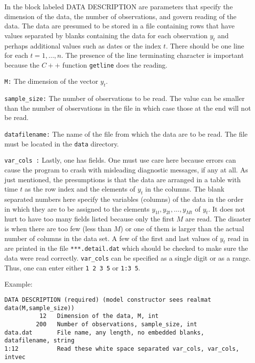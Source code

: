 \documentclass[11pt, letterpaper, notitlepage]{article}
\begin{document}
In the block labeled DATA DESCRIPTION are parameters that specify the dimension of the data, the number of observations, and govern reading of the data. The data are presumed to be stored in a file containing rows that have values separated by blanks containing the data for each observation $y_t$ and perhaps additional values such as dates or the index $t$. There should be one line for each $t = 1, \dots , n$. The presence of the line terminating character is important because the $C++$ function \texttt{getline} does the reading.

\texttt{M:} The dimension of the vector $y_t$.

\texttt{sample\_size:} The number of observations to be read. The value can be smaller than the number of observations in the file in which case those at the end will not be read.

\texttt{datafilename:} The name of the file from which the data are to be read. The file must be located in the \texttt{data} directory.

\texttt{var\_cols :} Lastly, one has fields. One must use care here because errors can cause the program to crash with misleading diagnostic messages, if any at all. As just mentioned, the presumptions is that the data are arranged in a table with time $t$ as the row index and the elements of $y_t$ in the columns. The blank separated numbers here specify the variables (columns) of the data in the order in which they are to be assigned to the elements $y_{1t}, y_{2t}, \dots, y_{Mt}$ of $y_t$. It does not hurt to have too many fields listed because only the first $M$ are read. The disaster is when there are too few (less than $M$) or one of them is larger than the actual number of columns in the data set. A few of the first and last values of $y_t$ read in are printed in the file \texttt{***.detail.dat} which should be checked to make sure the data were read correctly. \texttt{var\_cols} can be specified as a single digit or as a range. Thus, one can enter either \texttt{1 2 3 5} or \texttt{1:3 5}.


Example:

\begin{verbatim}
DATA DESCRIPTION (required) (model constructor sees realmat data(M,sample_size))
          12   Dimension of the data, M, int
         200   Number of observations, sample_size, int
data.dat       File name, any length, no embedded blanks, datafilename, string
1:12           Read these white space separated var_cols, var_cols, intvec

\end{verbatim}
\end{document}

